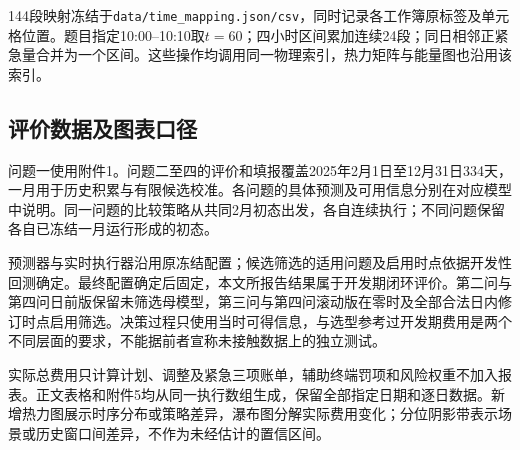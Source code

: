 144段映射冻结于\texttt{data/time\_mapping.json/csv}，同时记录各工作簿原标签及单元格位置。题目指定10:00--10:10取$t=60$；四小时区间累加连续24段；同日相邻正紧急量合并为一个区间。这些操作均调用同一物理索引，热力矩阵与能量图也沿用该索引。

\subsection{评价数据及图表口径}

问题一使用附件1。问题二至四的评价和填报覆盖2025年2月1日至12月31日334天，一月用于历史积累与有限候选校准。各问题的具体预测及可用信息分别在对应模型中说明。同一问题的比较策略从共同2月初态出发，各自连续执行；不同问题保留各自已冻结一月运行形成的初态。

预测器与实时执行器沿用原冻结配置；候选筛选的适用问题及启用时点依据开发性回测确定。最终配置确定后固定，本文所报告结果属于开发期闭环评价。第二问与第四问日前版保留未筛选母模型，第三问与第四问滚动版在零时及全部合法日内修订时点启用筛选。决策过程只使用当时可得信息，与选型参考过开发期费用是两个不同层面的要求，不能据前者宣称未接触数据上的独立测试。

实际总费用只计算计划、调整及紧急三项账单，辅助终端罚项和风险权重不加入报表。正文表格和附件5均从同一执行数组生成，保留全部指定日期和逐日数据。新增热力图展示时序分布或策略差异，瀑布图分解实际费用变化；分位阴影带表示场景或历史窗口间差异，不作为未经估计的置信区间。
